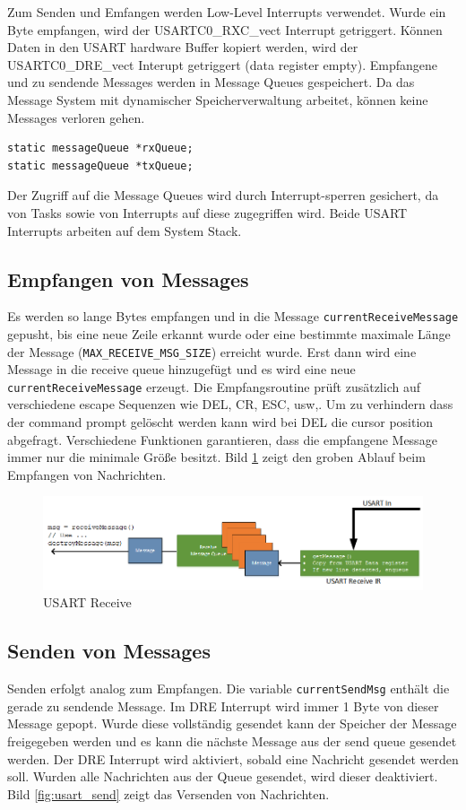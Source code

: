 \documentclass[fontsize=12pt, toc=bibliography, notitlepage]{scrreprt}
\begin{document}
Zum Senden und Emfangen werden Low-Level Interrupts verwendet. Wurde ein Byte empfangen, wird der USARTC0\_RXC\_vect Interrupt getriggert. Können Daten in den USART hardware Buffer kopiert werden, wird der USARTC0\_DRE\_vect Interupt getriggert (data register empty). Empfangene und zu sendende Messages werden in Message Queues gespeichert. Da das Message System mit dynamischer Speicherverwaltung arbeitet, können keine Messages verloren gehen.\\

\begin{lstlisting}
static messageQueue *rxQueue;
static messageQueue *txQueue;
\end{lstlisting}

Der Zugriff auf die Message Queues wird durch Interrupt-sperren gesichert, da von Tasks sowie von Interrupts auf diese zugegriffen wird. Beide USART Interrupts arbeiten auf dem System Stack.

\subsection{Empfangen von Messages}
Es werden so lange Bytes empfangen und in die Message \lstinline$currentReceiveMessage$ gepusht, bis eine neue Zeile erkannt wurde oder eine bestimmte maximale Länge der Message (\lstinline$MAX_RECEIVE_MSG_SIZE$) erreicht wurde. Erst dann wird eine Message in die receive queue hinzugefügt und es wird eine neue \lstinline$currentReceiveMessage$ erzeugt. Die Empfangsroutine prüft zusätzlich auf verschiedene escape Sequenzen wie DEL, CR, ESC, usw,. Um zu verhindern dass der command prompt gelöscht werden kann wird bei DEL die cursor position abgefragt. Verschiedene Funktionen garantieren, dass die empfangene Message immer nur die minimale Größe besitzt. Bild \ref{fig:usart_receive} zeigt den groben Ablauf beim Empfangen von Nachrichten.

\begin{figure}[H]
	\centering
	\includegraphics[width=450px]{images/UsartIn.png}
	\caption{USART Receive}
	\label{fig:usart_receive}
\end{figure}

\subsection{Senden von Messages}
Senden erfolgt analog zum Empfangen. Die variable \lstinline$currentSendMsg$ enthält die gerade zu sendende Message. Im DRE Interrupt wird immer 1 Byte von dieser Message gepopt. Wurde diese vollständig gesendet kann der Speicher der Message freigegeben werden und es kann die nächste Message aus der send queue gesendet werden. Der DRE Interrupt wird aktiviert, sobald eine Nachricht gesendet werden soll. Wurden alle Nachrichten aus der Queue gesendet, wird dieser deaktiviert. Bild \ref{fig:usart_send} zeigt das Versenden von Nachrichten.
\end{document}
